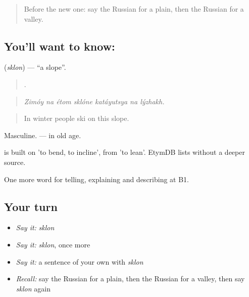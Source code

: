 \label{lesson:RU-C458-sklon}



\begin{quote}
Before the new one: say the Russian for a plain, then the Russian for a valley.
\end{quote}

\subsection*{You'll want to know: }
\textbf{} (\emph{sklon}) — \textquotedblleft{}a slope\textquotedblright{}.

\begin{quote}
      .
\end{quote}

\begin{quote}
\emph{Zimóy na étom sklóne katáyutsya na lýzhakh.}
\end{quote}

\begin{quote}
In winter people ski on this slope.
\end{quote}

Masculine. \emph{  } — in old age.

\begin{cousinweb}
\emph{} is built on \emph{} 'to bend, to incline', from \emph{} 'to lean'. EtymDB lists \emph{} without a deeper source.
\end{cousinweb}

\begin{grammarlens}[title={What you've built}]
One more word for telling, explaining and describing at B1.
\end{grammarlens}

\subsection*{Your turn}
\begin{itemize}
\raggedright
  \item \emph{Say it:} \emph{sklon}
  \item \emph{Say it:} \emph{sklon}, once more
  \item \emph{Say it:} a sentence of your own with \emph{sklon}
  \item \emph{Recall:} say the Russian for a plain, then the Russian for a valley, then say \emph{sklon} again
\end{itemize}

